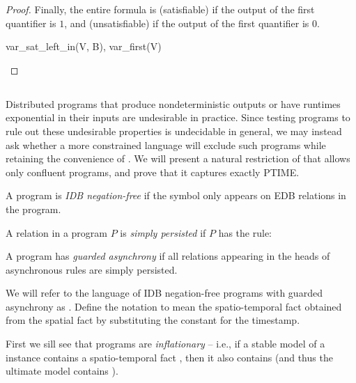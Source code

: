 \begin{proof}
Finally, the entire formula is  (satisfiable) if the output of the first quantifier is $1$, and  (unsatisfiable) if the output of the first quantifier is $0$.

\begin{Drules}
        {var_sat_left_in(V, B), var_first(V)}
\end{Drules}
\end{proof}

\subsection{\large \bf \slang}

Distributed programs that produce nondeterministic outputs or have
runtimes exponential in their inputs are undesirable in practice.  Since testing
\lang programs to rule out these undesirable properties is undecidable in
general, we may instead ask whether a more constrained language will exclude
such programs while retaining the convenience of \lang.  We will present a
natural restriction of \lang that allows only confluent programs, and prove that
it captures exactly PTIME.

\begin{definition}
A \lang program is {\em IDB negation-free} if the \dedalus{!} symbol only appears on EDB relations in the program.
\end{definition}

\begin{definition}
A relation  in a program $P$ is {\em simply persisted} if $P$ has the rule: 
\end{definition}

\begin{definition}
A \lang program has {\em guarded asynchrony} if all relations appearing in the heads of asynchronous rules are simply persisted.
\end{definition}

We will refer to the language of IDB negation-free \lang programs with guarded asynchrony as \slang.  Define the notation  to mean the spatio-temporal fact obtained from the spatial fact  by substituting the constant  for the timestamp. 

First we sill see that \slang programs are {\em inflationary} -- i.e., if a stable model of a \slang instance contains a spatio-temporal fact , then it also contains  (and thus the ultimate model contains ).

